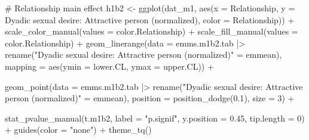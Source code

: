 \documentclass[
  bookmarksnumbered]{article}
\newenvironment{Shaded}{\begin{snugshade}}{\end{snugshade}}
\newcommand{\AttributeTok}[1]{\textcolor[rgb]{0.80,0.80,0.80}{#1}}
\newcommand{\CommentTok}[1]{\textcolor[rgb]{0.50,0.62,0.50}{#1}}
\newcommand{\DecValTok}[1]{\textcolor[rgb]{0.86,0.86,0.80}{#1}}
\newcommand{\FloatTok}[1]{\textcolor[rgb]{0.75,0.75,0.82}{#1}}
\newcommand{\FunctionTok}[1]{\textcolor[rgb]{0.94,0.94,0.56}{#1}}
\newcommand{\NormalTok}[1]{\textcolor[rgb]{0.80,0.80,0.80}{#1}}
\newcommand{\OtherTok}[1]{\textcolor[rgb]{0.94,0.94,0.56}{#1}}
\newcommand{\SpecialCharTok}[1]{\textcolor[rgb]{0.86,0.64,0.64}{#1}}
\newcommand{\StringTok}[1]{\textcolor[rgb]{0.80,0.58,0.58}{#1}}
\begin{document}
\begin{Shaded}
\begin{Highlighting}[]
\CommentTok{\# Relationship main effect}
\NormalTok{h1b2 }\OtherTok{\textless{}{-}} \FunctionTok{ggplot}\NormalTok{(dat\_m1, }\FunctionTok{aes}\NormalTok{(}\AttributeTok{x =}\NormalTok{ Relationship, }\AttributeTok{y =} \StringTok{\textasciigrave{}}\AttributeTok{Dyadic sexual desire: Attractive person (normalized)}\StringTok{\textasciigrave{}}\NormalTok{, }
                          \AttributeTok{color =}\NormalTok{ Relationship)) }\SpecialCharTok{+}
  \FunctionTok{scale\_color\_manual}\NormalTok{(}\AttributeTok{values =}\NormalTok{ color.Relationship) }\SpecialCharTok{+}
  \FunctionTok{scale\_fill\_manual}\NormalTok{(}\AttributeTok{values =}\NormalTok{ color.Relationship) }\SpecialCharTok{+}
  \FunctionTok{geom\_linerange}\NormalTok{(}\AttributeTok{data =}\NormalTok{ emms.m1b2.tab }\SpecialCharTok{|\textgreater{}} 
                  \FunctionTok{rename}\NormalTok{(}\StringTok{"Dyadic sexual desire: Attractive person (normalized)"} \OtherTok{=}\NormalTok{ emmean),}
                \AttributeTok{mapping =} \FunctionTok{aes}\NormalTok{(}\AttributeTok{ymin =}\NormalTok{ lower.CL, }\AttributeTok{ymax =}\NormalTok{ upper.CL)) }\SpecialCharTok{+}
                
  \FunctionTok{geom\_point}\NormalTok{(}\AttributeTok{data =}\NormalTok{ emms.m1b2.tab }\SpecialCharTok{|\textgreater{}} 
                  \FunctionTok{rename}\NormalTok{(}\StringTok{"Dyadic sexual desire: Attractive person (normalized)"} \OtherTok{=}\NormalTok{ emmean), }
             \AttributeTok{position =} \FunctionTok{position\_dodge}\NormalTok{(}\FloatTok{0.1}\NormalTok{), }
             \AttributeTok{size =} \DecValTok{3}\NormalTok{) }\SpecialCharTok{+}
             
  \FunctionTok{stat\_pvalue\_manual}\NormalTok{(t.m1b2, }
                     \AttributeTok{label =} \StringTok{"p.signif"}\NormalTok{, }
                     \AttributeTok{y.position =} \FloatTok{0.45}\NormalTok{, }
                     \AttributeTok{tip.length =} \DecValTok{0}\NormalTok{) }\SpecialCharTok{+}
  \FunctionTok{guides}\NormalTok{(}\AttributeTok{color =} \StringTok{"none"}\NormalTok{) }\SpecialCharTok{+}
  \FunctionTok{theme\_tq}\NormalTok{()}


\end{Highlighting}
\end{Shaded}
\end{document}
